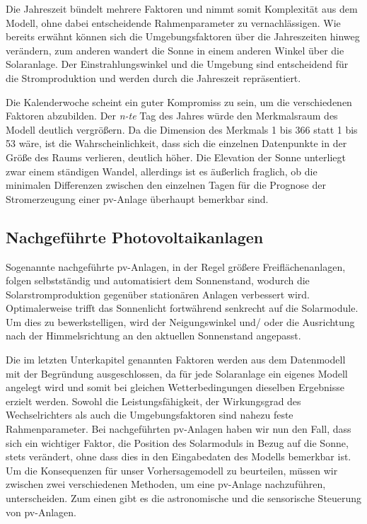 \documentclass[12pt, a4paper]{article}
\begin{document}
Die Jahreszeit bündelt mehrere Faktoren und nimmt somit Komplexität aus dem Modell, ohne dabei entscheidende Rahmenparameter zu vernachlässigen. Wie bereits erwähnt können sich die Umgebungsfaktoren über die Jahreszeiten hinweg verändern, zum anderen wandert die Sonne in einem anderen Winkel über die Solaranlage. Der Einstrahlungswinkel und die Umgebung sind entscheidend für die Stromproduktion und werden durch die Jahreszeit repräsentiert.

 Die Kalenderwoche scheint ein guter Kompromiss zu sein, um die verschiedenen Faktoren abzubilden. Der \textit{n-te} Tag des Jahres würde den Merkmalsraum des Modell deutlich vergrößern. Da die Dimension des Merkmals 1 bis 366 statt 1 bis 53 wäre, ist die Wahrscheinlichkeit, dass sich die einzelnen Datenpunkte in der Größe des Raums verlieren, deutlich höher. Die Elevation der Sonne unterliegt zwar einem ständigen Wandel, allerdings ist es äußerlich fraglich, ob die minimalen Differenzen zwischen den einzelnen Tagen für die Prognose der Stromerzeugung einer \ac{pv}-Anlage überhaupt bemerkbar sind.

 

\subsection{Nachgeführte Photovoltaikanlagen}
\label{subsec:tracked_systems}

Sogenannte nachgeführte \ac{pv}-Anlagen, in der Regel größere Freiflächenanlagen, folgen selbstständig und automatisiert dem Sonnenstand, wodurch die Solarstromproduktion gegenüber stationären Anlagen verbessert wird. Optimalerweise trifft das Sonnenlicht fortwährend senkrecht auf die Solarmodule. Um dies zu bewerkstelligen, wird der Neigungswinkel und/ oder die Ausrichtung nach der Himmelsrichtung an den aktuellen Sonnenstand angepasst. 

Die im letzten Unterkapitel genannten Faktoren werden aus dem Datenmodell mit der Begründung ausgeschlossen, da für jede Solaranlage ein eigenes Modell angelegt wird und somit bei gleichen Wetterbedingungen dieselben Ergebnisse erzielt werden. 
Sowohl die Leistungsfähigkeit, der Wirkungsgrad des Wechselrichters als auch die Umgebungsfaktoren sind nahezu feste Rahmenparameter. Bei nachgeführten \ac{pv}-Anlagen haben wir nun den Fall, dass sich ein wichtiger Faktor, die Position des Solarmoduls in Bezug auf die Sonne, stets verändert, ohne dass dies in den Eingabedaten des Modells bemerkbar ist. Um die Konsequenzen für unser Vorhersagemodell zu beurteilen, müssen wir zwischen zwei verschiedenen Methoden, um eine \ac{pv}-Anlage nachzuführen, unterscheiden. Zum einen gibt es die astronomische und die sensorische Steuerung von \ac{pv}-Anlagen. 
\end{document}
